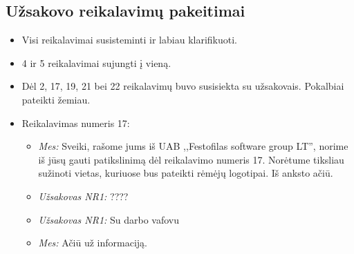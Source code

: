 \documentclass{VUMIFPSkursinis}
\begin{document}
	\subsection{Užsakovo reikalavimų pakeitimai} \label{priedai_uzsakovoReikalavimaiPakeitimai}
		\begin{itemize}
			\item Visi reikalavimai susisteminti ir labiau klarifikuoti.
			\item 4 ir 5 reikalavimai sujungti į vieną.
			\item Dėl 2, 17, 19, 21 bei 22 reikalavimų buvo susisiekta su užsakovais. Pokalbiai pateikti žemiau.
			\item Reikalavimas numeris 17:
				\begin{itemize}
					\item \textit{Mes:} Sveiki, rašome jums iš UAB ,,Festofilas software group LT'', norime iš jūsų gauti patikslinimą dėl reikalavimo numeris 17. Norėtume tiksliau sužinoti vietas, kuriuose bus pateikti rėmėjų logotipai. Iš anksto ačiū.
					\item \textit{Užsakovas NR1:} ????
					\item \textit{Užsakovas NR1:} Su darbo vafovu
					\item \textit{Mes:} Ačiū už informaciją.
					

\end{itemize}
\end{itemize}
\end{document}
